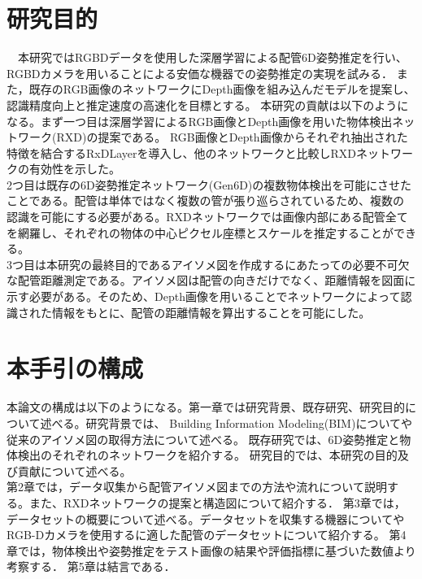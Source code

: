 \section{研究目的}
　本研究ではRGBDデータを使用した深層学習による配管6D姿勢推定を行い、RGBDカメラを用いることによる安価な機器での姿勢推定の実現を試みる．
また，既存のRGB画像のネットワークにDepth画像を組み込んだモデルを提案し、認識精度向上と推定速度の高速化を目標とする。
本研究の貢献は以下のようになる。まず一つ目は深層学習によるRGB画像とDepth画像を用いた物体検出ネットワーク(RXD)の提案である。
RGB画像とDepth画像からそれぞれ抽出された特徴を結合するRxDLayerを導入し、他のネットワークと比較しRXDネットワークの有効性を示した。\\
2つ目は既存の6D姿勢推定ネットワーク(Gen6D)の複数物体検出を可能にさせたことである。配管は単体ではなく複数の管が張り巡らされているため、複数の
認識を可能にする必要がある。RXDネットワークでは画像内部にある配管全てを網羅し、それぞれの物体の中心ピクセル座標とスケールを推定することができる。\\
3つ目は本研究の最終目的であるアイソメ図を作成するにあたっての必要不可欠な配管距離測定である。アイソメ図は配管の向きだけでなく、距離情報を図面に
示す必要がある。そのため、Depth画像を用いることでネットワークによって認識された情報をもとに、配管の距離情報を算出することを可能にした。

\section{本手引の構成}
 本論文の構成は以下のようになる。第一章では研究背景、既存研究、研究目的について述べる。研究背景では、
Building Information Modeling(BIM)についてや従来のアイソメ図の取得方法について述べる。
既存研究では、6D姿勢推定と物体検出のそれぞれのネットワークを紹介する。
研究目的では、本研究の目的及び貢献について述べる。\\
第2章では，データ収集から配管アイソメ図までの方法や流れについて説明する。また、RXDネットワークの提案と構造図について紹介する．
第3章では，データセットの概要について述べる。データセットを収集する機器についてやRGB-Dカメラを使用するに適した配管のデータセットについて紹介する。
第4章では，物体検出や姿勢推定をテスト画像の結果や評価指標に基づいた数値より考察する．
第5章は結言である．
